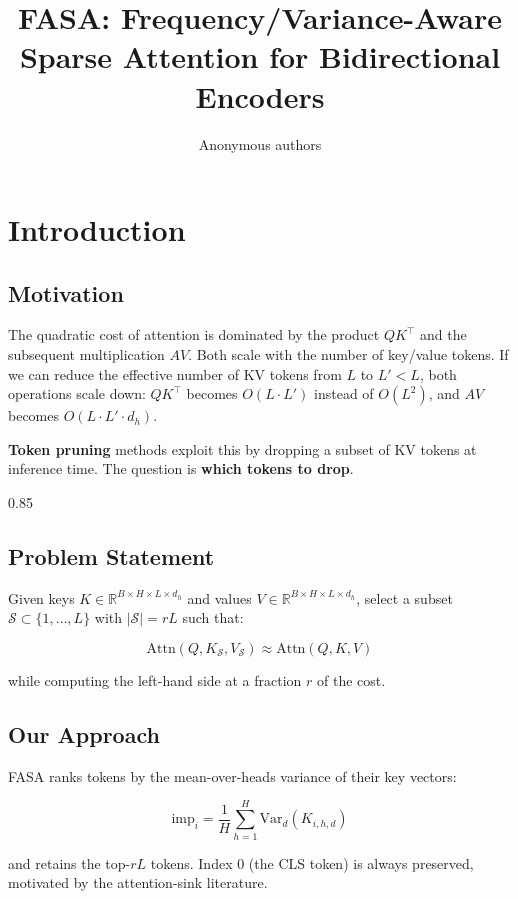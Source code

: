 \title{\textbf{FASA: Frequency/Variance-Aware Sparse Attention for Bidirectional Encoders}}

\author{Anonymous authors}



\section{Introduction}

\subsection{Motivation}

The quadratic cost of attention is dominated by the product $QK^\top$ and 
the subsequent multiplication $AV$. Both scale with the number of key/value 
tokens. If we can reduce the effective number of KV tokens from $L$ to 
$L' < L$, both operations scale down: $QK^\top$ becomes $O(L \cdot L')$ 
instead of $O(L^2)$, and $AV$ becomes $O(L \cdot L' \cdot d_h)$.

\textbf{Token pruning} methods exploit this by dropping a subset of KV tokens 
at inference time. The question is \textbf{which tokens to drop}.

0.85


\subsection{Problem Statement}

Given keys $K \in \mathbb{R}^{B \times H \times L \times d_h}$ and values 
$V \in \mathbb{R}^{B \times H \times L \times d_h}$, select a subset 
$\mathcal{S} \subset \{1, \ldots, L\}$ with $|\mathcal{S}| = r L$ such that:

\[
\text{Attn}(Q, K_{\mathcal{S}}, V_{\mathcal{S}}) \approx \text{Attn}(Q, K, V)
\tag{1.1}
\]

while computing the left-hand side at a fraction $r$ of the cost.

\subsection{Our Approach}

FASA ranks tokens by the mean-over-heads variance of their key vectors:

\[
\text{imp}_i = \frac{1}{H} \sum_{h=1}^{H} \text{Var}_d(K_{i,h,d})
\tag{1.2}
\]

and retains the top-$rL$ tokens. Index 0 (the CLS token) is always 
preserved, motivated by the attention-sink literature.


